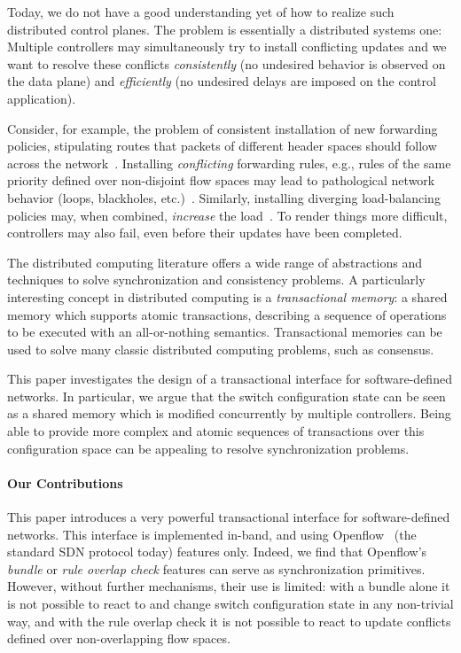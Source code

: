 \documentclass[conference]{sigcomm-alternate}
\begin{document}
Today, we do not have a good understanding yet of how to realize
such distributed control planes. The problem is essentially a
distributed systems
one: Multiple controllers may simultaneously try to
install conflicting updates and we want to resolve these conflicts
\emph{consistently} (no undesired behavior is observed on the data
plane) and \emph{efficiently} (no undesired delays are imposed on the
control application).

Consider, for example, the problem of
consistent installation of new forwarding policies, stipulating routes
that packets of different header spaces should follow across the
network~\cite{network-update,roger-hotnets,correct,stn}.
Installing \emph{conflicting} forwarding rules, e.g., rules of the same priority defined over non-disjoint
flow spaces may lead to pathological network behavior (loops,
blackholes, etc.)~\cite{cpc}.
Similarly, installing diverging load-balancing policies may,
when combined, \emph{increase} the load~\cite{log-cent}.
To render things more difficult, controllers may also fail,
even before their updates have been completed.

The distributed computing literature offers
a wide range of abstractions
and techniques to solve synchronization and consistency problems.
A particularly interesting concept in distributed computing is a \emph{transactional memory}:
a shared memory which supports atomic transactions, describing a sequence of operations
to be executed with an all-or-nothing semantics. Transactional memories can be used to
 solve many
classic distributed computing problems, such as consensus.

This paper investigates the design of a transactional interface for software-defined
networks. In particular, we argue that the switch configuration state can be seen
as a shared memory which is modified concurrently by multiple controllers.
Being able to provide more complex and atomic sequences of transactions over this configuration
space can be appealing to resolve synchronization problems.

\paragraph{Our Contributions}
This paper introduces a very powerful transactional interface
 for software-defined networks. This interface is implemented
 in-band, and
 using Openflow~\cite{of-spec} (the standard SDN protocol today) features only.
Indeed, we find that Openflow's \emph{bundle} or \emph{rule overlap check}
features can serve as synchronization primitives.
However, without further mechanisms, their use is limited:
with a bundle alone it is not possible to react to
and change switch configuration state in any non-trivial way,
and with the rule overlap check it is not possible to react to
update conflicts defined over non-overlapping flow spaces.
\end{document}
